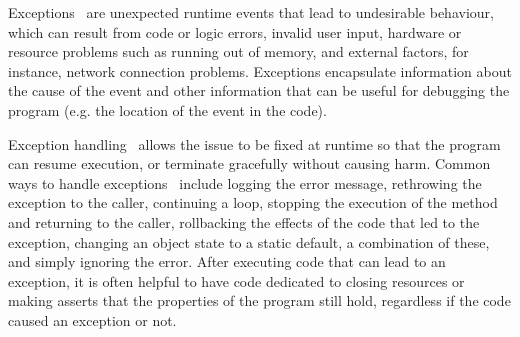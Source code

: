 \documentclass[sigplan]{acmart}
\begin{document}
Exceptions~\cite{eh} are unexpected runtime events that lead to undesirable behaviour, which can result from code or logic errors, invalid user input, hardware or resource problems such as running out of memory, and external factors, for instance, network connection problems.
Exceptions encapsulate information about the cause of the event and other information that can be useful for debugging the program (e.g. the location of the event in the code).

Exception handling~\cite{eh} allows the issue to be fixed at runtime so that the program can resume execution, or terminate gracefully without causing harm.
Common ways to handle exceptions~\cite{ehfieldstudy} include logging the error message, rethrowing the exception to the caller, continuing a loop, stopping the execution of the method and returning to the caller, rollbacking the effects of the code that led to the exception, changing an object state to a static default, a combination of these, and simply ignoring the error.
After executing code that can lead to an exception, it is often helpful to have code dedicated to closing resources or making asserts that the properties of the program still hold, regardless if the code caused an exception or not.
\end{document}

